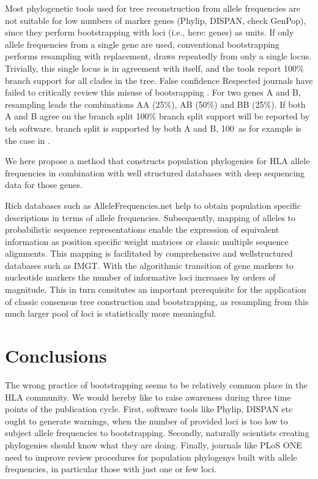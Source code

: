 \documentclass{article}
\begin{document}
Most phylogenetic tools used for tree reconstruction from allele frequencies are not suitable for low numbers of marker
genes (Phylip, DISPAN, check GenPop), since they perform bootstrapping with loci (i.e., here: genes) as units.
If only allele frequencies from a single gene are used, conventional bootstrapping performs resampling with replacement,
draws repeatedly from only a single locus. Trivially, this single locus is in agreement with itself, and the tools
report 100\% branch support for all clades in the tree.
False confidence
Respected journals have failed to critically review this misuse of bootsrapping \cite{Villena2017Jan,Hajjej2018Mar}.
For two genes A and B, resampling leads the combinations AA (25\%), AB (50\%) and BB (25\%). If both A and B agree on the branch split
100\% branch split support will be reported by teh software. branch split is
supported by both A and B, 100\
as for example is the case in \cite{Hajjej2018Mar}.


We here propose a method that constructs population phylogenies for HLA allele frequencies in combination with well structured databases
with deep sequencing data for those genes.

Rich databases such as AlleleFrequencies.net help to obtain population specific descriptions in terms of allele
frequencies. Subsequently, mapping of alleles to probabilistic sequence representations enable
the expression of equivalent information as position specific weight matrices or classic multiple sequence alignments.
 This mapping is facilitated by comprehensive and wellstructured databases such as IMGT.
With the algorithmic transition of gene markers to nucleotide markers
the number of informative loci increases by orders of magnitude.
This in turn consitutes an important prerequisite for the application of classic consensus tree construction and
bootstrapping, as resampling from this much larger pool of loci is
statistically more meaningful.



\section{Conclusions}

The wrong practice of bootstrapping seems to be relatively common place in the HLA community.
We would hereby like to raise awareness during three time points of the publication cycle. First, software tools like
Phylip, DISPAN etc ought to generate warnings, when the number of provided loci is too low to subject allele frequencies to
bootstrapping. Secondly, naturally scientists creating phylogenies should know what they are doing. Finally, journals like
PLoS ONE need to improve review procedures for population phylogenys built with allele frequencies, in particular those with
just one or few loci.



\end{document}
